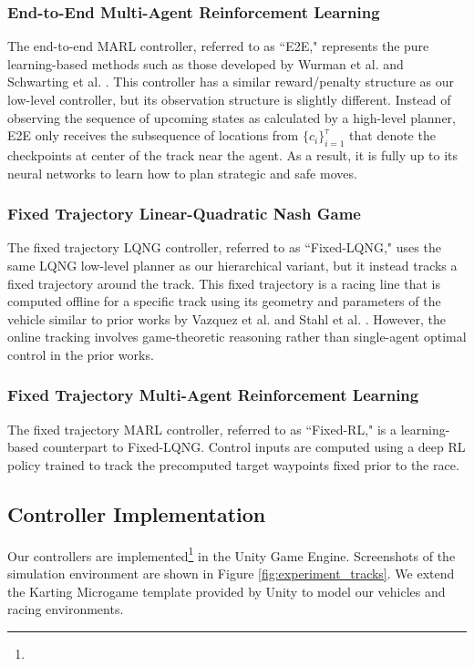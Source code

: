 \subsubsection{End-to-End Multi-Agent Reinforcement Learning}
The end-to-end MARL controller, referred to as ``E2E," represents the pure learning-based methods such as those developed by Wurman et al. and Schwarting et al. \cite{sonyai, Schwarting2021}. This controller has a similar reward/penalty structure as our low-level controller, but its observation structure is slightly different. Instead of observing the sequence of upcoming states as calculated by a high-level planner, E2E only receives the subsequence of locations from $\{c_i\}_{i=1}^{\tau}$ that denote the checkpoints at center of the track near the agent. As a result, it is fully up to its neural networks to learn how to plan strategic and safe moves. 

\subsubsection{Fixed Trajectory Linear-Quadratic Nash Game}
The fixed trajectory LQNG controller, referred to as ``Fixed-LQNG," uses the same LQNG low-level planner as our hierarchical variant, but it instead tracks a fixed trajectory around the track. This fixed trajectory is a racing line that is computed offline for a specific track using its geometry and parameters of the vehicle similar to prior works by Vazquez et al. and Stahl et al. \cite{Vazquez2020, Stahl2019_2}. However, the online tracking involves game-theoretic reasoning rather than single-agent optimal control in the prior works.

\subsubsection{Fixed Trajectory Multi-Agent Reinforcement Learning}
The fixed trajectory MARL controller, referred to as ``Fixed-RL," is a learning-based counterpart to Fixed-LQNG. Control inputs are computed using a deep RL policy trained to track the precomputed target waypoints fixed prior to the race.  
\subsection{Controller Implementation}
Our controllers are implemented\footnote{\codeurl} in the Unity Game Engine. Screenshots of the simulation environment are shown in Figure \ref{fig:experiment_tracks}. We extend the Karting Microgame template provided by Unity \cite{microkarting} to model our vehicles and racing environments. 

